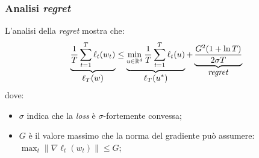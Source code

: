 \subsubsection{Analisi \textit{regret}}
L'analisi della \textit{regret} mostra che:
$$
\underbrace{\frac{1}{T}\sum_{t=1}^{T}\ell_t(w_t)}_{\displaystyle\ell_T(w)}\leq
\underbrace{\min_{u\in\mathbb{R}^d} \frac{1}{T}\sum_{t=1}^T \ell_t(u)}_
    {\displaystyle\ell_T(u^*)}
+\underbrace{\frac{G^2(1+\ln{T})}{2\sigma T}}_{\displaystyle\text{\textit{regret}}}
$$
dove:
\begin{itemize}
    \item $\sigma$ indica che la \textit{loss} è $\sigma$-fortemente convessa;
    \item $G$ è il valore massimo che la norma del gradiente può assumere: 
        $\max_t{\|\nabla\ell_t(w_t)\|\leq G}$;
\end{itemize}